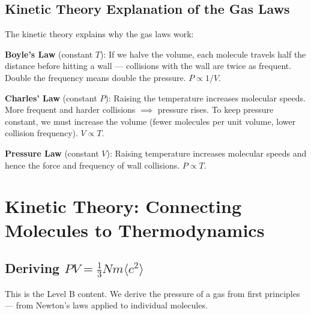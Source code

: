 \subsection{Kinetic Theory Explanation of the Gas Laws}

The kinetic theory explains why the gas laws work:

\textbf{Boyle's Law} (constant $T$): If we halve the
volume, each molecule travels half the distance before
hitting a wall --- collisions with the wall are twice
as frequent. Double the frequency means double the
pressure. $P \propto 1/V$.

\textbf{Charles' Law} (constant $P$): Raising the
temperature increases molecular speeds. More frequent
and harder collisions $\implies$ pressure rises. To
keep pressure constant, we must increase the volume
(fewer molecules per unit volume, lower collision
frequency). $V \propto T$.

\textbf{Pressure Law} (constant $V$): Raising temperature
increases molecular speeds and hence the force and
frequency of wall collisions. $P \propto T$.

\section{Kinetic Theory: Connecting Molecules to
Thermodynamics}

\subsection{Deriving \texorpdfstring{$PV = \frac{1}{3}Nm\langle c^2\rangle$}{PV = (1/3) N m <c\textasciicircum{}2>} }

This is the Level B content. We derive the pressure
of a gas from first principles --- from Newton's laws
applied to individual molecules.

